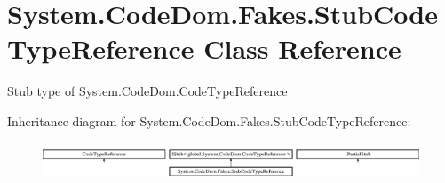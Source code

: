 \hypertarget{class_system_1_1_code_dom_1_1_fakes_1_1_stub_code_type_reference}{\section{System.\-Code\-Dom.\-Fakes.\-Stub\-Code\-Type\-Reference Class Reference}
\label{class_system_1_1_code_dom_1_1_fakes_1_1_stub_code_type_reference}
}


Stub type of System.\-Code\-Dom.\-Code\-Type\-Reference 


Inheritance diagram for System.\-Code\-Dom.\-Fakes.\-Stub\-Code\-Type\-Reference\-:\begin{figure}[H]
\begin{center}
\leavevmode
\includegraphics[height=1.131313cm]{class_system_1_1_code_dom_1_1_fakes_1_1_stub_code_type_reference}
\end{center}
\end{figure}
